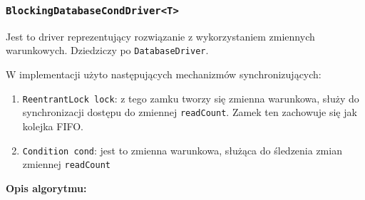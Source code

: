 \documentclass[11pt]{article}
\providecommand{\tightlist}{%
      \setlength{\itemsep}{0pt}\setlength{\parskip}{0pt}}
\begin{document}
    \hypertarget{blockingdatabaseconddrivert}{%
\subsubsection{\texorpdfstring{\texttt{BlockingDatabaseCondDriver\textless{}T\textgreater{}}}{BlockingDatabaseCondDriver\textless T\textgreater{}}}\label{blockingdatabaseconddrivert}}

Jest to driver reprezentujący rozwiązanie z wykorzystaniem zmiennych
warunkowych. Dziedziczy po \texttt{DatabaseDriver}.

W implementacji użyto następujących mechanizmów synchronizujących:

\begin{enumerate}
\def\labelenumi{\arabic{enumi}.}
\tightlist
\item
  \texttt{ReentrantLock\ lock}: z tego zamku tworzy się zmienna
  warunkowa, służy do synchronizacji dostępu do zmiennej
  \texttt{readCount}. Zamek ten zachowuje się jak kolejka FIFO.
\item
  \texttt{Condition\ cond}: jest to zmienna warunkowa, służąca do
  śledzenia zmian zmiennej \texttt{readCount}
\end{enumerate}

\textbf{Opis algorytmu:}
\end{document}
